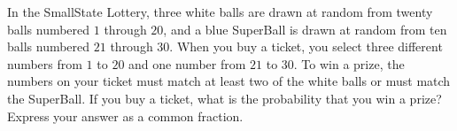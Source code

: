 In the SmallState Lottery, three white balls are drawn at random from twenty balls numbered $1$ through $20$, and a blue SuperBall is drawn at random from ten balls numbered $21$ through $30$. When you buy a ticket, you select three different numbers from $1$ to $20$ and one number from $21$ to $30$. To win a prize, the numbers on your ticket must match at least two of the white balls or must match the SuperBall. If you buy a ticket, what is the probability that you win a prize? Express your answer as a common fraction.
